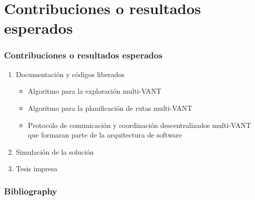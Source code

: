 \documentclass[
	12pt, %
	aspectratio=169, %
]{beamer}
\begin{document}
\section{Contribuciones o resultados esperados}

\begin{frame}

  \frametitle{Contribuciones o resultados esperados}

  \begin{enumerate}
  \item<1-> Documentación y códigos liberados
    \begin{itemize}
    \item Algoritmo para la exploración multi-VANT
    \item Algoritmo para la planificación de rutas multi-VANT
    \item Protocolo de comunicación y coordinación descentralizados multi-VANT que formaran parte de la arquitectura de software
    \end{itemize}
  \item<2-> Simulación de la solución
  \item<3-> Tesis impresa
  \end{enumerate}
  
\end{frame}

\begin{frame}
  \frametitle{Bibliography}
  
  
\end{frame}
\end{document}
